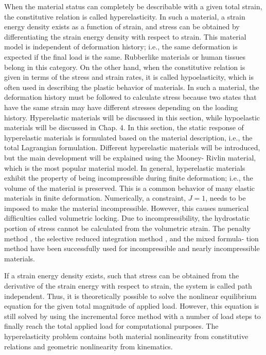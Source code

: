 When the material status can completely be describable with a given total strain,
the constitutive relation is called hyperelasticity. In such a material, a strain energy density exists as a function of strain, and stress can be obtained by differentiating
the strain energy density with respect to strain. This material model is independent
of deformation history; i.e., the same deformation is expected if the ﬁnal load is the
same. Rubberlike materials or human tissues belong in this category. On the other
hand, when the constitutive relation is given in terms of the stress and strain rates, it
is called hypoelasticity, which is often used in describing the plastic behavior of
materials. In such a material, the deformation history must be followed to calculate
stress because two states that have the same strain may have different stresses
depending on the loading history. Hyperelastic materials will be discussed in this
section, while hypoelastic materials will be discussed in Chap. 4. In this section, the
static response of hyperelastic materials is formulated based on the material
description, i.e., the total Lagrangian formulation. Different hyperelastic materials
will be introduced, but the main development will be explained using the Mooney-
Rivlin material, which is the most popular material model. In general, hyperelastic
materials exhibit the property of being incompressible during ﬁnite deformation;
i.e., the volume of the material is preserved. This is a common behavior of many
elastic materials in ﬁnite deformation. Numerically, a constraint, $J = 1$, needs to be
imposed to make the material incompressible. However, this causes numerical
difﬁculties called volumetric locking. Due to incompressibility, the hydrostatic
portion of stress cannot be calculated from the volumetric strain. The penalty
method , the selective reduced integration method , and the mixed formula-
tion method have been successfully used for incompressible and nearly
incompressible materials.

If a strain energy density exists, such that stress can be obtained from the
derivative of the strain energy with respect to strain, the system is called path
independent. Thus, it is theoretically possible to solve the nonlinear equilibrium
equation for the given total magnitude of applied load. However, this equation is
still solved by using the incremental force method with a number of load steps to
ﬁnally reach the total applied load for computational purposes. The hyperelasticity
problem contains both material nonlinearity from constitutive relations and geometric nonlinearity from kinematics.

